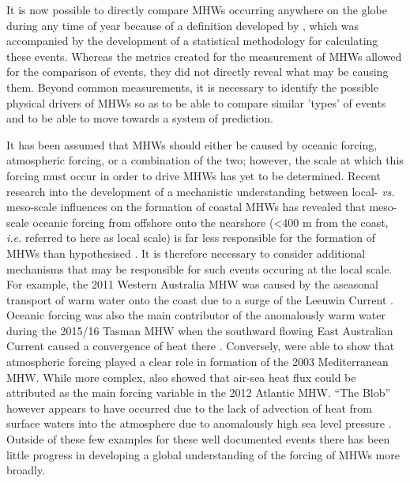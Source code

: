 \documentclass[a4paper,10pt,review]{elsarticle}
\begin{document}
It is now possible to directly compare MHWs occurring anywhere on the globe during any time of year because of a definition developed by \citet{Hobday2016}, which was accompanied by the development of a statistical methodology for calculating these events. Whereas the metrics created for the measurement of MHWs allowed for the comparison of events, they did not directly reveal what may be causing them. Beyond common measurements, it is necessary to identify the possible physical drivers of MHWs so as to be able to compare similar 'types' of events and to be able to move towards a system of prediction.

It has been assumed that MHWs should either be caused by oceanic forcing, atmospheric forcing, or a combination of the two; however, the scale at which this forcing must occur in order to drive MHWs has yet to be determined. Recent research into the development of a mechanistic understanding between local- \emph{vs.} meso-scale influences on the formation of coastal MHWs has revealed that meso-scale oceanic forcing from offshore onto the nearshore (<400 m from the coast, \emph{i.e.} referred to here as local scale) is far less responsible for the formation of MHWs than hypothesised \citep{Schlegel2017}. It is therefore necessary to consider additional mechanisms that may be responsible for such events occuring at the local scale. For example, the 2011 Western Australia MHW \citep{Pearce2013} was caused by the aseasonal transport of warm water onto the coast due to a surge of the Leeuwin Current \citep{Feng2013, Benthuysen2014}. Oceanic forcing was also the main contributor of the anomalously warm water during the 2015/16 Tasman MHW when the southward flowing East Australian Current caused a convergence of heat there \citep{Oliver2017}. Conversely, \citet{Garrabou2009} were able to show that atmospheric forcing played a clear role in formation of the 2003 Mediterranean MHW. While more complex, \citet{Chen2015a} also showed that air-sea heat flux could be attributed as the main forcing variable in the 2012 Atlantic MHW. ``The Blob'' however appears to have occurred due to the lack of advection of heat from surface waters into the atmosphere due to anomalously high sea level pressure \citep{Bond2015a}. Outside of these few examples for these well documented events there has been little progress in developing a global understanding of the forcing of MHWs more broadly.
\end{document}
